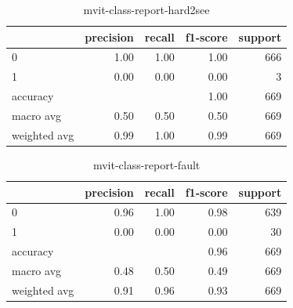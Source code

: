 \begin{table}[h!]
    \begin{tabular}{|l|r|r|r|r|}
                \hline & precision &   recall & f1-score &  support \\ \hline
                0 &      1.00 &     1.00 &     1.00 &      666 \\
                1 &      0.00 &     0.00 &     0.00 &        3 \\ \hline
         accuracy &           &          &     1.00 &      669 \\
        macro avg &      0.50 &     0.50 &     0.50 &      669 \\
     weighted avg &      0.99 &     1.00 &     0.99 &      669 \\

         \hline
    \end{tabular}
    \caption{mvit-class-report-hard2see}
    \label{tbl:mvit-class-report-hard2see}
\end{table}

\begin{table}[h!]
    \begin{tabular}{|l|r|r|r|r|}
                \hline & precision &   recall & f1-score &  support \\ \hline
                0 &      0.96 &     1.00 &      0.98 &       639 \\
                1 &      0.00 &     0.00 &      0.00 &        30 \\ \hline
         accuracy &           &          &      0.96 &       669 \\
        macro avg &      0.48 &     0.50 &      0.49 &       669 \\
     weighted avg &      0.91 &     0.96 &      0.93 &       669 \\
         \hline
    \end{tabular}
    \caption{mvit-class-report-fault}
    \label{tbl:mvit-class-report-fault}
\end{table}
